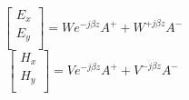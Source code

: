  \begin{equation}
 \left[ {\begin{array}{c}
               E_x \\
               E_y \\
               \end{array} } \right]
            =  We^{-j \beta z}A^+ + W^{+j \beta z}A^-
 \label{eq:10}
 \end{equation}
  \begin{equation}
 \left[ {\begin{array}{c}
              H_x \\
              H_y \\
              \end{array} } \right]
            = Ve^{-j \beta z}A^+ + V^{-j \beta z}A^-
 \label{eq:11}
 \end{equation}



